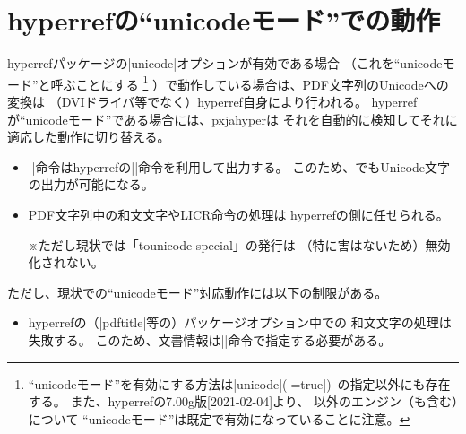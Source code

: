 \documentclass[uplatex,dvipdfmx,a4paper]{jsarticle}
\renewcommand{\headfont}{\gtfamily\romanseries{sbc}\sffamily}
\newcommand{\Pkg}[1]{\textsf{#1}}
\newcommand{\Note}{\par\noindent ※}
\providecommand{\Strong}[1]{{\headfont#1}}
\begin{document}
\section{hyperrefの“unicodeモード”での動作}
\label{sec:Unicode-mode}

\Pkg{hyperref}パッケージの|unicode|オプションが有効である場合
（これを“unicodeモード”と呼ぶことにする
\footnote{“unicodeモード”を有効にする方法は|unicode|(|=true|)\,%
  の指定以外にも存在する。
  また、\Pkg{hyperref}の7.00g版[2021-02-04]より、
  {\pLaTeX}以外のエンジン（\Strong{{\upLaTeX}も含む}）について
  “unicodeモード”は既定で有効になっていることに注意。}%
）で動作している場合は、PDF文字列のUnicodeへの変換は
（DVIドライバ等でなく）\Pkg{hyperref}自身により行われる。
\Pkg{hyperref}が“unicodeモード”である場合には、\Pkg{pxjahyper}は
それを自動的に検知してそれに適応した動作に切り替える。
\begin{itemize}
\item |\Ux|命令は\Pkg{hyperref}の|\unichar|命令を利用して出力する。
  このため、{\pLaTeX}でもUnicode文字の出力が可能になる。
\item PDF文字列中の和文文字やLICR命令の処理は
  \Pkg{hyperref}の側に任せられる。
  \Note ただし現状では「tounicode special」の発行は
  （特に害はないため）無効化されない。
\end{itemize}
ただし、現状での“unicodeモード”対応動作には以下の制限がある。
\begin{itemize}
\item \Pkg{hyperref}の（|pdftitle|等の）パッケージオプション中での
  和文文字の処理は失敗する。
  このため、文書情報は|\hypersetup|命令で指定する必要がある。
\end{itemize}
\end{document}
